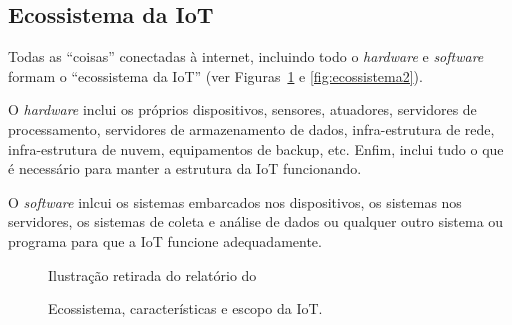 \documentclass[pdftex, brazil, 12pt, twoside]{article}
\newcommand{\ingles}[1]{\textit{#1}}
\begin{document}
\subsection{Ecossistema da IoT}
\label{o-que-e-iot-ecossistema}

Todas as ``coisas'' conectadas à internet, incluindo todo o \ingles{hardware}
e \ingles{software} formam o ``ecossistema da IoT'' (ver Figuras~\ref{fig:ecossistema1}
e \ref{fig:ecossistema2}).

O \ingles{hardware} inclui os próprios dispositivos, sensores, atuadores,
servidores de processamento, servidores de armazenamento de dados,
infra-estrutura de rede, infra-estrutura de nuvem, equipamentos de backup, etc. Enfim,
inclui tudo o que é necessário para manter a estrutura da IoT funcionando.

O \ingles{software} inlcui os sistemas embarcados nos dispositivos, os sistemas
nos servidores, os sistemas de coleta e análise de dados ou qualquer outro
sistema ou programa para que a IoT funcione adequadamente.

\begin{figure}[h]
  \begin{center}
    \caption{Ecossistema, características e escopo da IoT.}
    \label{fig:ecossistema1}
    
    \footnotesize{Ilustração retirada do relatório do~\citet{IEEEIoTDefinition}}
  \end{center}
\end{figure}
\end{document}
